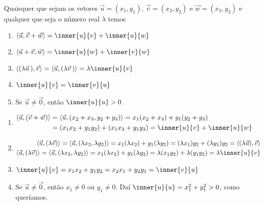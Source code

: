 \begin{proposicao}\label{propriedades-produto-interno}
  Quaisquer que sejam os vetores $\vec{u} = (x_1, y_1)$, $\vec{v} = (x_2, y_2)$ e $\vec{w} = (x_3, y_3)$ e qualquer que seja o número real $\lambda$ temos
  \begin{enumerate}[label=({\roman*})]
    \item\label{linearidade-produto-interno} $\langle \vec{u}, \vec{v} + \vec{w}\rangle = \inner{u}{v} + \inner{u}{w}$
    \item $\langle \vec{u} + \vec{v}, \vec{w}\rangle = \inner{u}{w} + \inner{v}{w}$
    \item\label{linearidade2-produto-interno} $\langle (\lambda \vec{u}\,), \vec{v}\rangle = \langle \vec{u}, (\lambda \vec{v}\,)\rangle = \lambda\inner{u}{v}$
    \item $\inner{u}{v} = \inner{v}{u}$
    \item Se $\vec{u} \ne \vec{0}$, então $\inner{u}{u} > 0$.
  \end{enumerate}
\end{proposicao}
\begin{prova}
  \begin{enumerate}[label=({\roman*})]
    \item \begin{align*}
      \langle\vec{u}, (\vec{v} + \vec{w})\rangle &= \langle\vec{u}, (x_2 + x_3, y_2 + y_3)\rangle = x_1(x_2 + x_3) + y_1(y_2 + y_3) \\ &= (x_1x_2 + y_1y_2) + (x_1x_3 + y_1y_3) = \inner{u}{v} + \inner{u}{w}
    \end{align*}
    \item \begin{align*}
      \langle\vec{u}, (\lambda\vec{v})\rangle = \langle\vec{u}, (\lambda x_2, \lambda y_2)\rangle = x_1(\lambda x_2) + y_1(\lambda y_2) = (\lambda x_1)y_2 + (\lambda y_1)y_2 = \langle(\lambda\vec{u}),\vec{v}\rangle\\
      \langle\vec{u},(\lambda\vec{v})\rangle = \langle\vec{u}, (\lambda x_2, \lambda y_2)\rangle = x_1(\lambda x_2) + y_1(\lambda y_2) = \lambda (x_1y_2) + \lambda (y_1y_2) = \lambda\inner{u}{v}
    \end{align*}
    \item $\inner{u}{v} = x_1x_2 + y_1y_2 = x_2x_1 + y_2y_1 = \inner{v}{u}$
    \item Se $\vec{u} \ne \vec{0}$, então $x_1 \ne 0$ ou $y_1 \ne 0$. Daí $\inner{u}{u} = x_1^2 + y_1^2 > 0$, como queríamos.
  \end{enumerate}
\end{prova}


